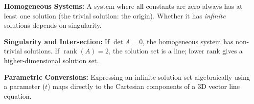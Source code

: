 \begin{takeaways}
\item \textbf{Homogeneous Systems:} A system where all constants are zero always has at least one solution (the trivial solution: the origin). Whether it has \textit{infinite} solutions depends on singularity.
\item \textbf{Singularity and Intersection:} If $\det A=0$, the homogeneous system has non-trivial solutions. If $\operatorname{rank}(A)=2$, the solution set is a line; lower rank gives a higher-dimensional solution set.
\item \textbf{Parametric Conversions:} Expressing an infinite solution set algebraically using a parameter ($t$) maps directly to the Cartesian components of a 3D vector line equation.
\end{takeaways}


